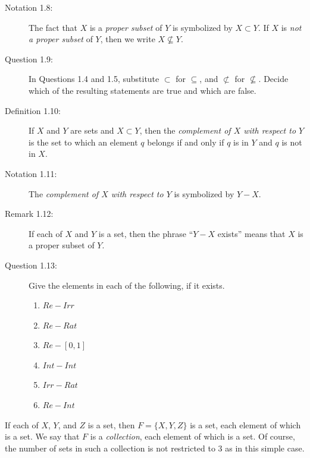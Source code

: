\documentclass{book}
\begin{document}
\begin{description}
\item[Notation 1.8:] The fact that $X$ is a \emph{proper subset} of $Y$ is symbolized by $X \subset Y$. If $X$ is \emph{not a proper subset} of $Y$, then we write $X \not \subseteq Y$.

\item[Question 1.9:] In Questions 1.4 and 1.5, substitute $\subset$ for $\subseteq$, and $\not \subset$ for $\not \subseteq$. Decide which of the resulting statements are true and which are false.

\item[Definition 1.10:] If $X$ and $Y$ are sets and $X \subset Y$, then the \emph{complement of $X$ with respect to $Y$} is the set to which an element $q$ belongs if and only if $q$ is in $Y$ and $q$ is not in $X$.

\item[Notation 1.11:] The \emph{complement of $X$ with respect to $Y$} is symbolized by $Y - X$.

\item[Remark 1.12:] If each of $X$ and $Y$ is a set, then the phrase ``$Y - X$ exists'' means that $X$ is a proper subset of $Y$.

\item[Question 1.13:] Give the elements in each of the following, if it exists.
\begin{enumerate}[\hspace{1cm}(a)]
  \item $Re - Irr$
  \item $Re - Rat$
  \item $Re - [0,1]$
  \item $Int - Int$
  \item $Irr - Rat$
  \item $Re - Int$
\end{enumerate}

\end{description}

If each of $X$, $Y$, and $Z$ is a set, then $F = \{ X, Y, Z \}$ is a set, each element of which is a set. We say that $F$ is a \emph{collection}, each element of which is a set. Of course, the number of sets in such a collection is not restricted to 3 as in this simple case.
\end{document}
